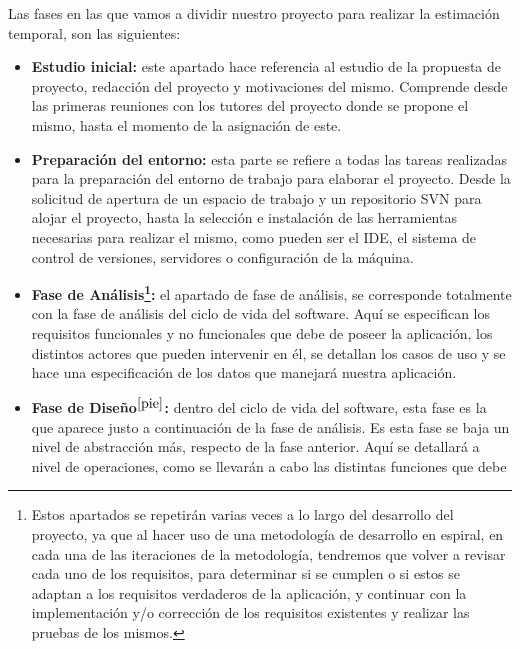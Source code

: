 Las fases en las que vamos a dividir nuestro proyecto para realizar la
estimación temporal, son las siguientes:

\begin{itemize}
    \item \textbf{Estudio inicial:} este apartado hace referencia al estudio
           de la propuesta de proyecto, redacción del proyecto y motivaciones
           del mismo. Comprende desde las primeras reuniones con los tutores del
           proyecto donde se propone el mismo, hasta el momento de la asignación
           de este.
    \item \textbf{Preparación del entorno:} esta parte se refiere a todas las
           tareas realizadas para la preparación del entorno de trabajo para
           elaborar el proyecto. Desde la solicitud de apertura de un espacio de
           trabajo y un repositorio SVN para alojar el proyecto, hasta la
           selección e instalación de las herramientas necesarias para realizar
           el mismo, como pueden ser el IDE, el sistema de control de versiones,
           servidores o configuración de la máquina.
    \item \textbf{Fase de Análisis\footnote{\label{pie}Estos apartados se
           repetirán varias veces a lo largo del desarrollo del proyecto, ya que
           al hacer uso de una metodología de desarrollo en espiral, en cada una
           de las iteraciones de la metodología, tendremos que volver a revisar
           cada uno de los requisitos, para determinar si se cumplen o si estos
           se adaptan a los requisitos verdaderos de la aplicación, y continuar
           con la implementación y/o corrección de los requisitos existentes y
           realizar las pruebas de los mismos.}:} el apartado de fase de
           análisis, se corresponde totalmente con la fase de análisis del ciclo
           de vida del software. Aquí se especifican los requisitos funcionales
           y no funcionales que debe de poseer la aplicación, los distintos
           actores que pueden intervenir en él, se detallan los casos de uso y
           se hace una especificación de los datos que manejará nuestra
           aplicación.
    \item \textbf{Fase de Diseño$^{\ref{pie}}$:} dentro del ciclo de vida del
           software, esta fase es la que aparece justo a continuación de la fase
           de análisis. Es esta fase se baja un nivel de abstracción más,
           respecto de la fase anterior. Aquí se detallará a nivel de
           operaciones, como se llevarán a cabo las distintas funciones que debe

\end{itemize}
